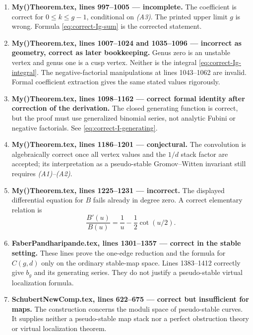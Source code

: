 \documentclass[12pt]{memoir}
\begin{document}
\begin{enumerate}
 \item \textbf{My()Theorem.tex, lines 997--1005 --- incomplete.}  The
 coefficient is correct for \(0\leq k\leq g-1\), conditional on
 \emph{(A3)}.  The printed upper limit \(g\) is wrong.  Formula
 \eqref{eq:correct-Ig-sum} is the corrected statement.

 \item \textbf{My()Theorem.tex, lines 1007--1024 and 1035--1096 ---
 incorrect as geometry, correct as later bookkeeping.}  Genus zero is an
 unstable vertex and genus one is a cusp vertex.  Neither is the integral
 \eqref{eq:correct-Ig-integral}.  The negative-factorial manipulations at
 lines 1043--1062 are invalid.  Formal coefficient extraction gives the
 same stated values rigorously.

 \item \textbf{My()Theorem.tex, lines 1098--1162 --- correct formal
 identity after correction of the derivation.}  The closed generating
 function is correct, but the proof must use generalized binomial series,
 not analytic Fubini or negative factorials.  See
 \eqref{eq:correct-I-generating}.

 \item \textbf{My()Theorem.tex, lines 1186--1201 --- conjectural.}  The
 convolution is algebraically correct once all vertex values and the
 \(1/d\) stack factor are accepted; its interpretation as a pseudo-stable
 Gromov--Witten invariant still requires \emph{(A1)--(A2)}.

 \item \textbf{My()Theorem.tex, lines 1225--1231 --- incorrect.}  The
 displayed differential equation for \(B\) fails already in degree zero.
 A correct elementary relation is
 \[
   \frac{B'(u)}{B(u)}=\frac1u-\frac12\cot(u/2).
 \]

 \item \textbf{FaberPandharipande.tex, lines 1301--1357 --- correct in the
 stable setting.}  These lines prove the one-edge reduction and the formula
 for \(C(g,d)\) only on the ordinary stable-map space.  Lines 1383--1412
 correctly give \(b_g\) and its generating series.  They do not justify a
 pseudo-stable virtual localization formula.

 \item \textbf{SchubertNewComp.tex, lines 622--675 --- correct but
 insufficient for maps.}  The construction concerns the moduli space of
 pseudo-stable curves.  It supplies neither a pseudo-stable map stack nor a
 perfect obstruction theory or virtual localization theorem.
\end{enumerate}
\end{document}
